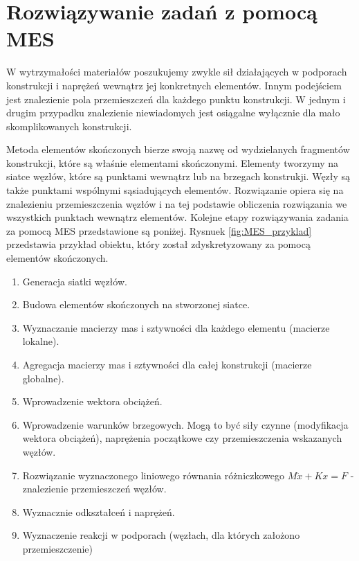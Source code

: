 
\section{Rozwiązywanie zadań z  pomocą MES}
\label{sec:rozwiazwyanie_zadan}

W wytrzymałości materiałów poszukujemy zwykle sił działających w podporach konstrukcji i naprężeń wewnątrz jej konkretnych elementów. Innym podejściem jest znalezienie pola przemieszczeń dla każdego punktu konstrukcji.  W jednym i drugim przypadku znalezienie niewiadomych jest osiągalne wyłącznie dla mało skomplikowanych konstrukcji.

Metoda elementów skończonych bierze swoją nazwę od wydzielanych fragmentów konstrukcji, które są właśnie elementami skończonymi. Elementy tworzymy na siatce węzłów, które są punktami wewnątrz lub na brzegach konstrukji. Węzły są także punktami wspólnymi sąsiadujących elementów. Rozwiązanie opiera się na znalezieniu przemieszczenia węzłów i na tej podstawie obliczenia rozwiązania we wszystkich punktach wewnątrz elementów. Kolejne etapy rozwiązywania zadania za pomocą MES przedstawione są poniżej. Rysnuek \ref{fig:MES_przyklad} przedstawia przykład obiektu, który został zdyskretyzowany za pomocą elementów skończonych.

\vspace{5 mm}

\begin{enumerate}
  \item Generacja siatki węzłów.
  \item Budowa elementów skończonych na stworzonej siatce.
  \item Wyznaczanie macierzy mas i sztywności dla każdego elementu (macierze lokalne).
  \item Agregacja macierzy mas  i sztywności dla całej konstrukcji (macierze globalne).
  \item Wprowadzenie wektora obciążeń.
  \item Wprowadzenie warunków brzegowych. Mogą to być siły czynne (modyfikacja wektora obciążeń), naprężenia początkowe czy przemieszczenia wskazanych węzłów.
  \item Rozwiązanie wyznaczonego liniowego równania różniczkowego \( M \ddot x + Kx = F \) - znalezienie przemieszczeń węzłów.
  \item Wyznacznie odkształceń i naprężeń.
  \item Wyznaczenie reakcji w podporach (węzłach, dla których założono przemieszczenie)
\end{enumerate}

